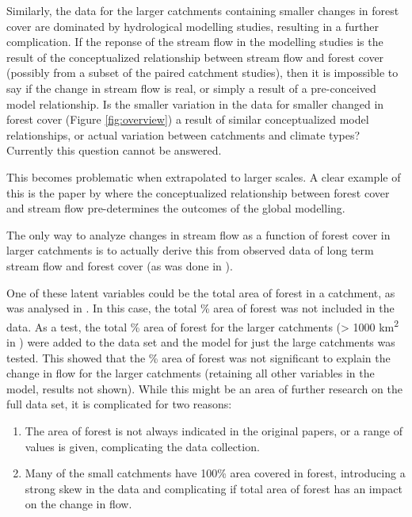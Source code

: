 \documentclass[]{elsarticle} %
\providecommand{\tightlist}{%
  \setlength{\itemsep}{0pt}\setlength{\parskip}{0pt}}
\begin{document}
Similarly, the data for the larger catchments containing smaller changes in forest cover are dominated by hydrological modelling studies, resulting in a further complication. If the reponse of the stream flow in the modelling studies is the result of the conceptualized relationship between stream flow and forest cover (possibly from a subset of the paired catchment studies), then it is impossible to say if the change in stream flow is real, or simply a result of a pre-conceived model relationship. Is the smaller variation in the data for smaller changed in forest cover (Figure \ref{fig:overview}) a result of similar conceptualized model relationships, or actual variation between catchments and climate types? Currently this question cannot be answered.

This becomes problematic when extrapolated to larger scales. A clear example of this is the paper by \citet{hoekvandijke2022} where the conceptualized relationship between forest cover and stream flow pre-determines the outcomes of the global modelling.

The only way to analyze changes in stream flow as a function of forest cover in larger catchments is to actually derive this from observed data of long term stream flow and forest cover (as was done in \citet{levy2018}).

One of these latent variables could be the total area of forest in a catchment, as was analysed in \citet{levy2018}. In this case, the total \% area of forest was not included in the data. As a test, the total \% area of forest for the larger catchments (\textgreater{} 1000 km\textsuperscript{2} in \citet{zhang2017}) were added to the data set and the model for just the large catchments was tested. This showed that the \% area of forest was not significant to explain the change in flow for the larger catchments (retaining all other variables in the model, results not shown). While this might be an area of further research on the full data set, it is complicated for two reasons:

\begin{enumerate}
\def\labelenumi{\arabic{enumi}.}
\tightlist
\item
  The area of forest is not always indicated in the original papers, or a range of values is given, complicating the data collection.
\item
  Many of the small catchments have 100\% area covered in forest, introducing a strong skew in the data and complicating if total area of forest has an impact on the change in flow.
\end{enumerate}
\end{document}
